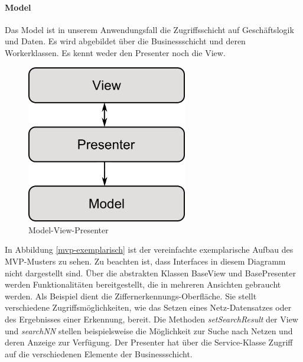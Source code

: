 \paragraph{Model} Das Model ist in unserem Anwendungsfall die Zugriffsschicht auf Geschäftslogik und Daten. Es wird abgebildet über die Businessschicht und deren Workerklassen. Es kennt weder den Presenter noch die View. 

\begin{figure}[H]
	\begin{center}
		\includegraphics[width=7cm]{Abbildungen/UML/daniel/MVP.png}
		\caption{Model-View-Presenter} 
		\label{mvp}
	\end{center}
\end{figure}

In Abbildung \ref{mvp-exemplarisch} ist der vereinfachte exemplarische Aufbau des MVP-Musters zu sehen. Zu beachten ist, dass Interfaces in diesem Diagramm nicht dargestellt sind. Über die abstrakten Klassen BaseView und BasePresenter werden Funktionalitäten bereitgestellt, die in mehreren Ansichten gebraucht werden. Als Beispiel dient die Ziffernerkennungs-Oberfläche. Sie stellt verschiedene Zugriffsmöglichkeiten, wie das Setzen eines Netz-Datensatzes oder des Ergebnisses einer Erkennung, bereit. Die Methoden \textit{setSearchResult} der View und \textit{searchNN} stellen beispielsweise die Möglichkeit zur Suche nach Netzen und deren Anzeige zur Verfügung. Der Presenter hat über die Service-Klasse Zugriff auf die verschiedenen Elemente der Businessschicht. 

